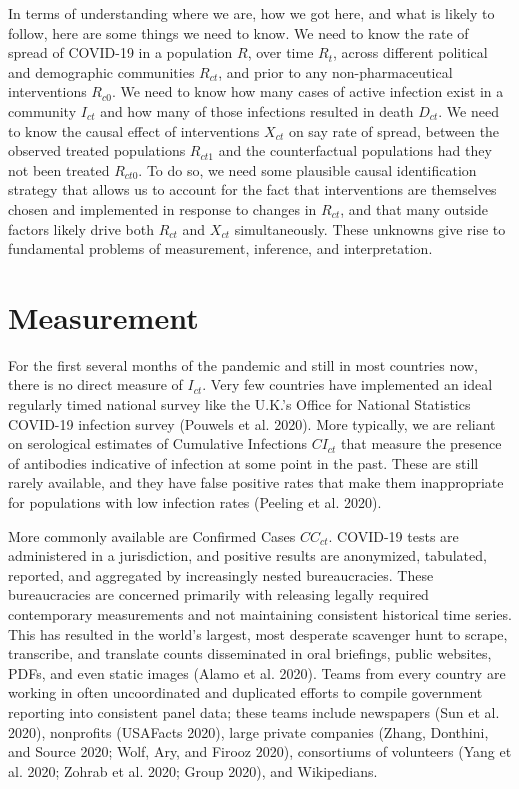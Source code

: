 \documentclass[10pt,letterpaper]{article}
\begin{document}
In terms of understanding where we are, how we got here, and what is
likely to follow, here are some things we need to know. We need to know
the rate of spread of COVID-19 in a population \(R\), over time
\(R_{t}\), across different political and demographic communities
\(R_{ct}\), and prior to any non-pharmaceutical interventions
\(R_{c0}\). We need to know how many cases of active infection exist in
a community \(I_{ct}\) and how many of those infections resulted in
death \(D_{ct}\). We need to know the causal effect of interventions
\(X_{ct}\) on say rate of spread, between the observed treated
populations \(R_{ct1}\) and the counterfactual populations had they not
been treated \(R_{ct0}\). To do so, we need some plausible causal
identification strategy that allows us to account for the fact that
interventions are themselves chosen and implemented in response to
changes in \(R_{ct}\), and that many outside factors likely drive both
\(R_{ct}\) and \(X_{ct}\) simultaneously. These unknowns give rise to
fundamental problems of measurement, inference, and interpretation.

\hypertarget{measurement}{%
\section{Measurement}\label{measurement}}

For the first several months of the pandemic and still in most countries
now, there is no direct measure of \(I_{ct}\). Very few countries have
implemented an ideal regularly timed national survey like the U.K.'s
Office for National Statistics COVID-19 infection survey (Pouwels et al.
2020). More typically, we are reliant on serological estimates of
Cumulative Infections \(CI_{ct}\) that measure the presence of
antibodies indicative of infection at some point in the past. These are
still rarely available, and they have false positive rates that make
them inappropriate for populations with low infection rates (Peeling et
al. 2020).

More commonly available are Confirmed Cases \(CC_{ct}\). COVID-19 tests
are administered in a jurisdiction, and positive results are anonymized,
tabulated, reported, and aggregated by increasingly nested
bureaucracies. These bureaucracies are concerned primarily with
releasing legally required contemporary measurements and not maintaining
consistent historical time series. This has resulted in the world's
largest, most desperate scavenger hunt to scrape, transcribe, and
translate counts disseminated in oral briefings, public websites, PDFs,
and even static images (Alamo et al. 2020). Teams from every country are
working in often uncoordinated and duplicated efforts to compile
government reporting into consistent panel data; these teams include
newspapers (Sun et al. 2020), nonprofits (USAFacts 2020), large private
companies (Zhang, Donthini, and Source 2020; Wolf, Ary, and Firooz
2020), consortiums of volunteers (Yang et al. 2020; Zohrab et al. 2020;
Group 2020), and Wikipedians.
\end{document}
